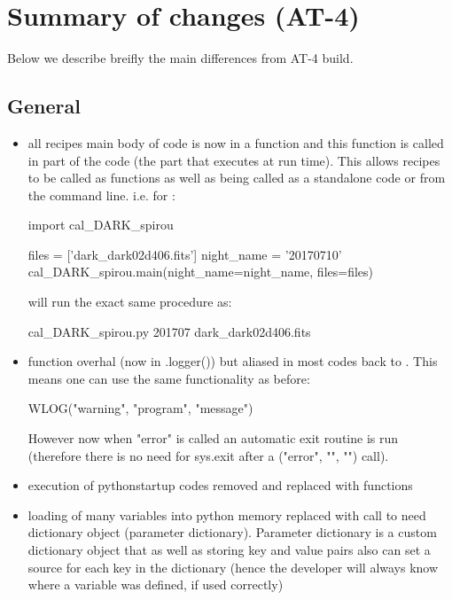 \chapter{Summary of changes (AT-4)}
\label{ch:changelog}

Below we describe breifly the main differences from AT-4 build.

\section{General}
\begin{itemize}

\item all recipes main body of code is now in a  function and this function is called in  part of the code (the part that executes at run time). This allows recipes to be called as functions as well as being called as a standalone code or from the command line. i.e. for \calDARK:
	\begin{pythonbox}
	import cal_DARK_spirou
	    
	files = ['dark_dark02d406.fits']
	night_name = '20170710'
	cal_DARK_spirou.main(night_name=night_name, files=files)
	\end{pythonbox}
	will run the exact same procedure as:
	\begin{bashbox}
	cal_DARK_spirou.py 201707 dark_dark02d406.fits
	\end{bashbox}

\item \WLOG function overhal (now in \spirouLog.logger()) but aliased in most codes back to \WLOG. This means one can use the same functionality as before:
	\begin{pythonbox}
	WLOG("warning", "program", "message")
	\end{pythonbox}
	However now when "error" is called an automatic exit routine is run (therefore there is no need for sys.exit after a \WLOG("error", "", "") call).

\item execution of pythonstartup codes removed and replaced with functions

\item loading of many variables into python memory replaced with call to need dictionary object (parameter dictionary). Parameter dictionary is a custom dictionary object that as well as storing key and value pairs also can set a source for each key in the dictionary (hence the developer will always know where a variable was defined, if used correctly)


\end{itemize}
